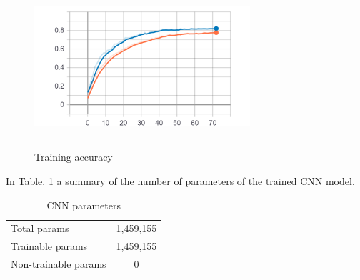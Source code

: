 \begin{figure}[h]
			\centering
	    	\includegraphics[width=8cm, height=6cm]{debug_tuy_acc}
	    	\caption{Training accuracy}
	    	\label{fig:CNN_accuracy}
\end{figure} 

\noindent In Table. \ref{table:CNN_parameters} a summary of the number of parameters of the trained CNN model.\\

\begin{table}[h!]
\centering
\begin{tabular}{| l | c |}
\hline
Total params &1,459,155\\
Trainable params& 1,459,155\\
Non-trainable params& 0\\
\hline
\end{tabular}
\caption{CNN parameters}
\label{table:CNN_parameters}
\end{table}





